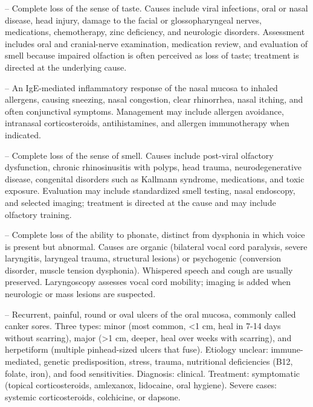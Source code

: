 -- Complete loss of the sense of taste. Causes include viral infections, oral or nasal disease, head injury, damage to the facial or glossopharyngeal nerves, medications, chemotherapy, zinc deficiency, and neurologic disorders. Assessment includes oral and cranial-nerve examination, medication review, and evaluation of smell because impaired olfaction is often perceived as loss of taste; treatment is directed at the underlying cause.

-- An IgE-mediated inflammatory response of the nasal mucosa to inhaled allergens, causing sneezing, nasal congestion, clear rhinorrhea, nasal itching, and often conjunctival symptoms. Management may include allergen avoidance, intranasal corticosteroids, antihistamines, and allergen immunotherapy when indicated.

-- Complete loss of the sense of smell. Causes include post-viral olfactory dysfunction, chronic rhinosinusitis with polyps, head trauma, neurodegenerative disease, congenital disorders such as Kallmann syndrome, medications, and toxic exposure. Evaluation may include standardized smell testing, nasal endoscopy, and selected imaging; treatment is directed at the cause and may include olfactory training.

-- Complete loss of the ability to phonate, distinct from dysphonia in which voice is present but abnormal. Causes are organic (bilateral vocal cord paralysis, severe laryngitis, laryngeal trauma, structural lesions) or psychogenic (conversion disorder, muscle tension dysphonia). Whispered speech and cough are usually preserved. Laryngoscopy assesses vocal cord mobility; imaging is added when neurologic or mass lesions are suspected.

-- Recurrent, painful, round or oval ulcers of the oral mucosa, commonly called canker sores. Three types: minor (most common, <1 cm, heal in 7-14 days without scarring), major (>1 cm, deeper, heal over weeks with scarring), and herpetiform (multiple pinhead-sized ulcers that fuse). Etiology unclear: immune-mediated, genetic predisposition, stress, trauma, nutritional deficiencies (B12, folate, iron), and food sensitivities. Diagnosis: clinical. Treatment: symptomatic (topical corticosteroids, amlexanox, lidocaine, oral hygiene). Severe cases: systemic corticosteroids, colchicine, or dapsone.

